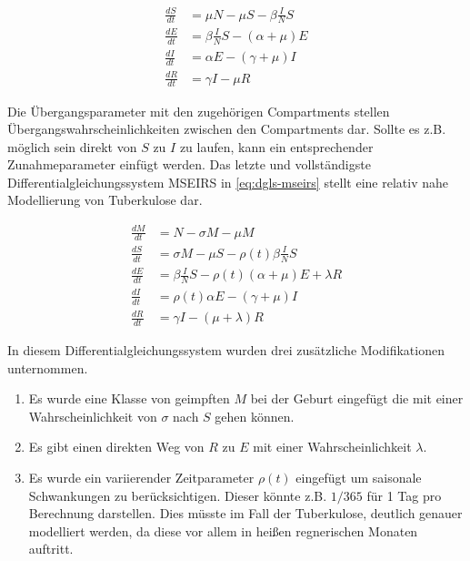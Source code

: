 \documentclass[paper=a4, fontsize=11pt, ngerman, abstract=on]{scrartcl}
\numberwithin{equation}{section} %
\numberwithin{figure}{section} %
\numberwithin{table}{section} %
\begin{document}
\begin{equation}
\begin{split}
  \frac{dS}{dt} &= \mu N - \mu S - \beta \frac{I}{N}S \\
  \frac{dE}{dt} &= \beta \frac{I}{N}S - (\alpha + \mu)E \\
  \frac{dI}{dt} &= \alpha E  - (\gamma + \mu)I \\
  \frac{dR}{dt} &= \gamma I - \mu R
\end{split}
\label{eq:dgls-seir}
\end{equation}

Die Übergangsparameter mit den zugehörigen Compartments stellen Übergangswahrscheinlichkeiten zwischen den Compartments dar. Sollte es z.B. möglich sein direkt von $S$ zu $I$ zu laufen, kann ein entsprechender Zunahmeparameter einfügt werden. Das letzte und vollständigste Differentialgleichungssystem MSEIRS in \ref{eq:dgls-mseirs} stellt eine relativ nahe Modellierung von Tuberkulose dar.

\begin{equation}
\begin{split}
  \frac{dM}{dt} &= N - \sigma M - \mu M \\
  \frac{dS}{dt} &= \sigma M - \mu S - \rho(t)\beta \frac{I}{N}S \\
  \frac{dE}{dt} &= \beta \frac{I}{N}S - \rho(t)(\alpha + \mu)E + \lambda R \\
  \frac{dI}{dt} &= \rho(t)\alpha E  - (\gamma + \mu)I \\
  \frac{dR}{dt} &= \gamma I - (\mu + \lambda) R
\end{split}
\label{eq:dgls-mseirs}
\end{equation}

In diesem Differentialgleichungssystem wurden drei zusätzliche Modifikationen unternommen.

\begin{enumerate}
  \item{Es wurde eine Klasse von geimpften $M$ bei der Geburt eingefügt die mit einer Wahrscheinlichkeit von $\sigma$ nach $S$ gehen können.}
  \item{Es gibt einen direkten Weg von $R$ zu $E$ mit einer Wahrscheinlichkeit $\lambda$.}
  \item{Es wurde ein variierender Zeitparameter $\rho (t)$ eingefügt um saisonale Schwankungen zu berücksichtigen. Dieser könnte z.B. $1/365$ für 1 Tag pro Berechnung darstellen. Dies müsste im Fall der Tuberkulose, deutlich genauer modelliert werden, da diese vor allem in heißen regnerischen Monaten auftritt.}
\end{enumerate}
\end{document}
